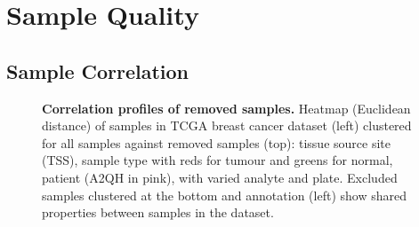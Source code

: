 



\chapter{Sample Quality}
\label{appendix:sample_checking}

\section{Sample Correlation}
\label{appendix:sample_correlation}


\begin{figure}[!ht]
  \begin{center}
   \end{center}
   \caption[Correlation profiles of removed samples]{\small \textbf{Correlation profiles of removed samples.} Heatmap (Euclidean distance) of samples in \gls{TCGA} breast cancer dataset (left) clustered for all samples against removed samples (top): 
   tissue source site (TSS), sample type with reds for tumour and greens for normal, patient (A2QH in pink), with varied analyte and plate. %
   Excluded samples clustered at the bottom and annotation (left) show  shared properties between samples in the dataset.
   }
\label{fig:corr_map_part}
\end{figure}

